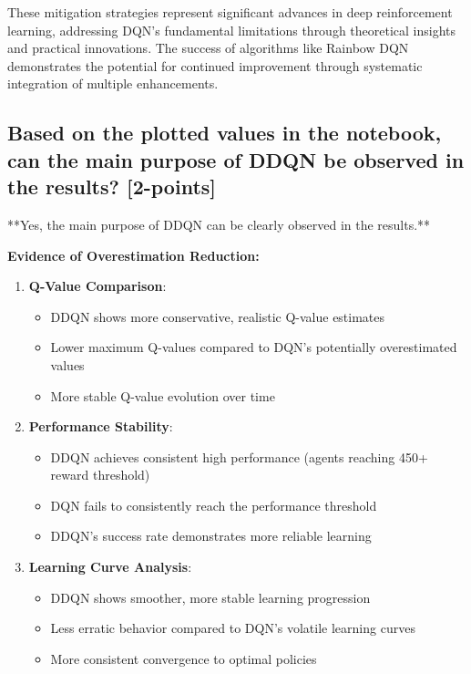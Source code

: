 \documentclass[12pt]{article}
\begin{document}
{{{These mitigation strategies represent significant advances in deep reinforcement learning, addressing DQN's fundamental limitations through theoretical insights and practical innovations. The success of algorithms like Rainbow DQN demonstrates the potential for continued improvement through systematic integration of multiple enhancements.

\subsection{Based on the plotted values in the notebook, can the main purpose of DDQN be observed in the results? [2-points]}

**Yes, the main purpose of DDQN can be clearly observed in the results.**

\textbf{Evidence of Overestimation Reduction:}

\begin{enumerate}
    \item \textbf{Q-Value Comparison}:
    \begin{itemize}
        \item DDQN shows more conservative, realistic Q-value estimates
        \item Lower maximum Q-values compared to DQN's potentially overestimated values
        \item More stable Q-value evolution over time
    \end{itemize}
    
    \item \textbf{Performance Stability}:
    \begin{itemize}
        \item DDQN achieves consistent high performance (agents reaching 450+ reward threshold)
        \item DQN fails to consistently reach the performance threshold
        \item DDQN's success rate demonstrates more reliable learning
    \end{itemize}
    
    \item \textbf{Learning Curve Analysis}:
    \begin{itemize}
        \item DDQN shows smoother, more stable learning progression
        \item Less erratic behavior compared to DQN's volatile learning curves
        \item More consistent convergence to optimal policies
    \end{itemize}
    

\end{enumerate}}}}
\end{document}

